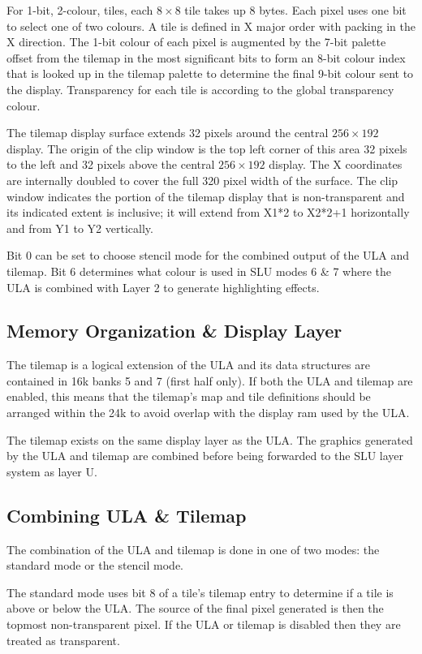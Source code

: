 For 1-bit, 2-colour, tiles, each $8\times8$ tile takes up 8
bytes. Each pixel uses one bit to select one of two colours. A tile is
defined in X major order with packing in the X direction. The 1-bit
colour of each pixel is augmented by the 7-bit palette offset from the
tilemap in the most significant bits to form an 8-bit colour index
that is looked up in the tilemap palette to determine the final 9-bit
colour sent to the display. Transparency for each tile is according to
the global transparency colour.

The tilemap display surface extends 32 pixels around the central
$256\times192$ display. The origin of the clip window is the top left
corner of this area 32 pixels to the left and 32 pixels above the
central $256\times192$ display. The X coordinates are internally
doubled to cover the full 320 pixel width of the surface. The clip
window indicates the portion of the tilemap display that is
non-transparent and its indicated extent is inclusive; it will extend
from X1*2 to X2*2+1 horizontally and from Y1 to Y2 vertically.

Bit 0 can be set to choose stencil mode for the combined output of the
ULA and tilemap. Bit 6 determines what colour is used in SLU modes 6 \&
7 where the ULA is combined with Layer 2 to generate highlighting
effects.

\subsection{Memory Organization \& Display Layer}
The tilemap is a logical extension of the ULA and its data structures
are contained in 16k banks 5 and 7 (first half only). If both the ULA
and tilemap are enabled, this means that the tilemap's map and tile
definitions should be arranged within the 24k to avoid overlap with
the display ram used by the ULA.

The tilemap exists on the same display layer as the ULA. The graphics
generated by the ULA and tilemap are combined before being forwarded
to the SLU layer system as layer U.

\subsection{Combining ULA \& Tilemap}
The combination of the ULA and tilemap is done in one of two modes:
the standard mode or the stencil mode.

The standard mode uses bit 8 of a tile's tilemap entry to determine if
a tile is above or below the ULA. The source of the final pixel
generated is then the topmost non-transparent pixel. If the ULA or
tilemap is disabled then they are treated as transparent.

